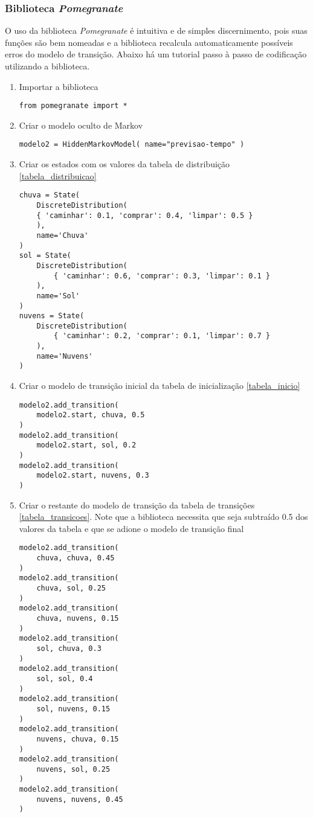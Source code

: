 \documentclass{article}
\begin{document}
\subsubsection{Biblioteca \emph{Pomegranate}}
O uso da biblioteca \emph{Pomegranate} é intuitiva e de simples discernimento, pois suas funções são bem nomeadas e a biblioteca recalcula automaticamente possíveis erros do modelo de transição. Abaixo há um  tutorial passo à passo de codificação utilizando a biblioteca.
\begin{enumerate}
\label{lista_pomegranate}
\item Importar a biblioteca
\begin{verbatim}
from pomegranate import * 
\end{verbatim}
    
\item Criar o modelo oculto de Markov
\begin{verbatim}
modelo2 = HiddenMarkovModel( name="previsao-tempo" )
\end{verbatim}
    
\item Criar os estados com os valores da tabela de distribuição \ref{tabela_distribuicao}
\begin{verbatim}
chuva = State( 
    DiscreteDistribution(
    { 'caminhar': 0.1, 'comprar': 0.4, 'limpar': 0.5 }
    ), 
    name='Chuva' 
)
sol = State( 
    DiscreteDistribution(
        { 'caminhar': 0.6, 'comprar': 0.3, 'limpar': 0.1 }
    ),
    name='Sol' 
)
nuvens = State( 
    DiscreteDistribution(
        { 'caminhar': 0.2, 'comprar': 0.1, 'limpar': 0.7 }
    ), 
    name='Nuvens'
)
\end{verbatim}

\item Criar o modelo de transição inicial da tabela de inicialização \ref{tabela_inicio}
\begin{verbatim}
modelo2.add_transition( 
    modelo2.start, chuva, 0.5
)
modelo2.add_transition( 
    modelo2.start, sol, 0.2
)
modelo2.add_transition(
    modelo2.start, nuvens, 0.3 
)
\end{verbatim}

\item Criar o restante do modelo de transição da tabela de transições \ref{tabela_transicoes}. Note que a biblioteca necessita que seja subtraído 0.5 dos valores da tabela e que se adione o modelo de transição final
\begin{verbatim}
modelo2.add_transition( 
    chuva, chuva, 0.45 
)
modelo2.add_transition( 
    chuva, sol, 0.25
)
modelo2.add_transition(
    chuva, nuvens, 0.15
)
modelo2.add_transition(
    sol, chuva, 0.3 
)
modelo2.add_transition(
    sol, sol, 0.4
)
modelo2.add_transition(
    sol, nuvens, 0.15 
) 
modelo2.add_transition(
    nuvens, chuva, 0.15
)
modelo2.add_transition(
    nuvens, sol, 0.25
)
modelo2.add_transition(
    nuvens, nuvens, 0.45 
)


\end{verbatim}
\end{enumerate}
\end{document}
